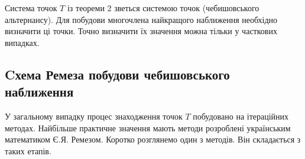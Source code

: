 \documentclass[ukrainian,14pt]{extarticle}
\begin{document}
Система точок $T$ із теореми 2 зветься системою точок (чебишовського альтернансу). Для побудови многочлена найкращого наближення  необхідно визначити ці точки. Точно визначити їх значення можна тільки у часткових випадках. 

\subsection{Cхема Ремеза побудови чебишовського наближення}

У загальному випадку процес знаходження точок $T$ побудовано на ітераційних методах. Найбільше практичне значення мають методи розроблені українським математиком Є.Я. Ремезом. Коротко розглянемо один з методів. Він складається з таких етапів.
\end{document}

